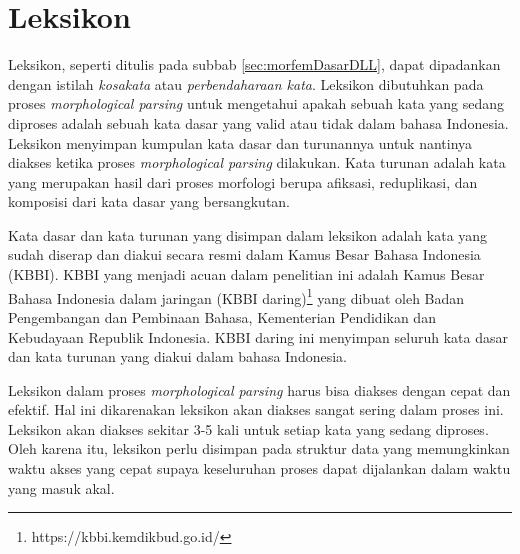 %
%

\section{Leksikon}
\label{sec:leksikon}
Leksikon, seperti ditulis pada subbab \ref{sec:morfemDasarDLL}, dapat dipadankan dengan istilah \textit{kosakata} atau \textit{perbendaharaan kata}. Leksikon dibutuhkan pada proses \textit{morphological parsing} untuk mengetahui apakah sebuah kata yang sedang diproses adalah sebuah kata dasar yang valid atau tidak dalam bahasa Indonesia. Leksikon menyimpan kumpulan kata dasar dan turunannya untuk nantinya diakses ketika proses \textit{morphological parsing} dilakukan. Kata turunan adalah kata yang merupakan hasil dari proses morfologi berupa afiksasi, reduplikasi, dan komposisi dari kata dasar yang bersangkutan.

Kata dasar dan kata turunan yang disimpan dalam leksikon adalah kata yang sudah diserap dan diakui secara resmi dalam Kamus Besar Bahasa Indonesia (KBBI). KBBI yang menjadi acuan dalam penelitian ini adalah Kamus Besar Bahasa Indonesia dalam jaringan (KBBI daring)\footnote{https://kbbi.kemdikbud.go.id/} yang dibuat oleh Badan Pengembangan dan Pembinaan Bahasa, Kementerian Pendidikan dan Kebudayaan Republik Indonesia. KBBI daring ini menyimpan seluruh kata dasar dan kata turunan yang diakui dalam bahasa Indonesia.

Leksikon dalam proses \textit{morphological parsing} harus bisa diakses dengan cepat dan efektif. Hal ini dikarenakan leksikon akan diakses sangat sering dalam proses ini. Leksikon akan diakses sekitar 3-5 kali untuk setiap kata yang sedang diproses. Oleh karena itu, leksikon perlu disimpan pada struktur data yang memungkinkan waktu akses yang cepat supaya keseluruhan proses dapat dijalankan dalam waktu yang masuk akal. 

